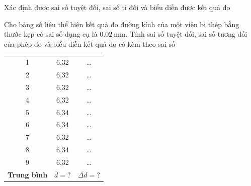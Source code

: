 \begin{dang}{Xác định được sai số tuyệt đối, sai số tỉ đối và biểu diễn được kết quả đo}
\end{dang}
\begin{vd}
	Cho bảng số liệu thể hiện kết quả đo đường kính của một viên bi thép bằng thước kẹp có sai số dụng cụ là $\SI{0.02}{\milli\meter}$. Tính sai số tuyệt đối, sai số tương đối của phép đo và biểu diễn kết quả đo có kèm theo sai số
	\begin{longtable}{|c|c|c|}
		\hline
		\thead{Lần đo} & \thead{$d \left(\si{\milli\meter}\right)$} & \thead{$\Delta d \left(\si{\milli\meter}\right)$}\\
		\hline
		1 & 6,32 & \dots\\
		\hline
		2 & 6,32 & \dots\\
		\hline
		3 & 6,32 & \dots\\
		\hline
		4 & 6,32 & \dots\\
		\hline
		5 & 6,34 & \dots\\
		\hline
		6 & 6,34 & \dots\\
		\hline
		7 & 6,32 & \dots\\
		\hline
		8 & 6,34 & \dots\\
		\hline
		9 & 6,32 & \dots\\
		\hline
		\textbf{Trung bình} & $\overline{d}=?$ & $\overline{\Delta d}=?$\\
		\hline
	\end{longtable}
	
\end{vd}

